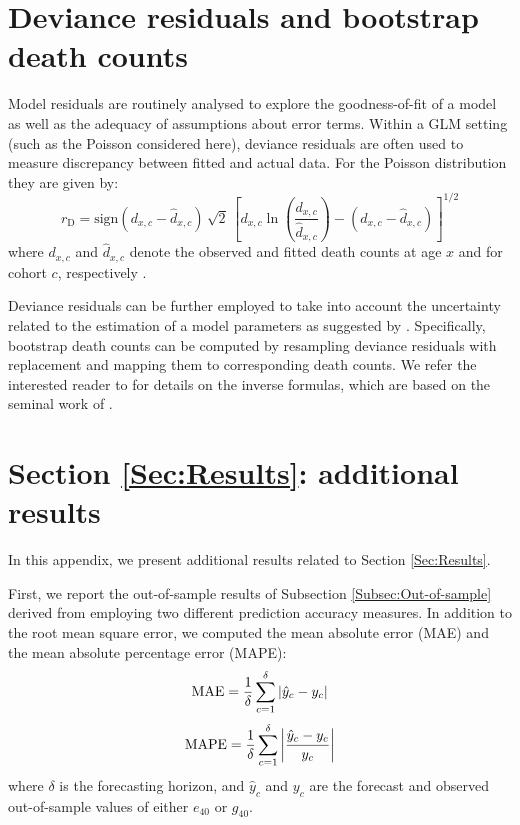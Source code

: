 \documentclass[11pt, a4paper]{article}
\begin{document}
\newpage
\appendix
{}

\section{Deviance residuals and bootstrap death counts}
\label{Appendix:ResidualDeath}     
Model residuals are routinely analysed to explore the goodness-of-fit of a model as well as the adequacy of assumptions about error terms. Within a GLM setting (such as the Poisson considered here), deviance residuals are often used to measure discrepancy between fitted and actual data. For the Poisson distribution they are given by: 
\begin{equation}\label{Eq:DevRes}
r_{\mathrm{D}}= \mathrm{sign} (d_{x,c}-\hat{d}_{x,c}) \, \sqrt{2} \, 
\left[d_{x,c} \ln \left(\frac{d_{x,c}}{\hat{d}_{x,c}}\right) - 
\left(d_{x,c}-\hat{d}_{x,c}\right)
\right]^{1/2}
\end{equation}
where $d_{x,c}$ and $\hat{d}_{x,c}$ denote the observed and fitted death counts at age $x$ and for cohort $c$, respectively \citep{mccullagh1989glm}. 

Deviance residuals can be further employed to take into account the uncertainty related to the estimation of a model parameters as suggested by \cite{koissi2006evaluating}. Specifically, bootstrap death counts can be computed by resampling deviance residuals with replacement and mapping them to corresponding death counts. We refer the interested reader to \cite{renshaw2008simulation} for details on the inverse formulas, which are based on the seminal work of \cite{efron1994introduction}.  

\section{Section \ref{Sec:Results}: additional results}
\label{Appendix:AdditResults}     

In this appendix, we present additional results related to Section \ref{Sec:Results}. 

First, we report the out-of-sample results of Subsection \ref{Subsec:Out-of-sample} derived from employing two different prediction accuracy measures. In addition to the root mean square error, we computed the mean absolute error (MAE) and the mean absolute percentage error (MAPE):
%
\begin{equation}\label{Eq:MAE}
\mathrm{MAE} = \frac{1}{\delta} \sum_{c=1}^{\delta} \left| \hat{y}_c - y_c \right|  \notag 
\end{equation} 
%
\begin{equation}\label{Eq:MAPE}
\mathrm{MAPE}= \frac{1}{\delta}  \sum_{c=1}^{\delta} \left| \frac{\hat{y}_c - y_c}{y_c}  \right|  \notag
\end{equation} 
%
where $\delta$ is the forecasting horizon, and $\hat{y}_c$ and $y_c$ are the forecast and observed out-of-sample values of either $e_{40}$ or $g_{40}$. 
\end{document}
